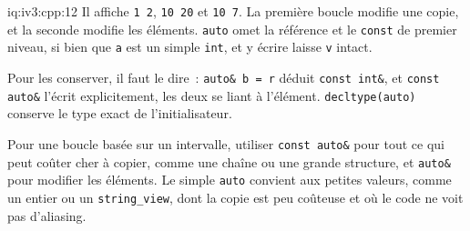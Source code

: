 \begin{solution}{iq:iv3:cpp:12}
Il affiche \texttt{1 2}, \texttt{10 20} et \texttt{10 7}. La première boucle modifie une copie, et la seconde modifie les éléments. \texttt{auto} omet la référence et le \texttt{const} de premier niveau, si bien que \texttt{a} est un simple \texttt{int}, et y écrire laisse \texttt{v} intact.

Pour les conserver, il faut le dire~: \texttt{auto\& b = r} déduit \texttt{const int\&}, et \texttt{const auto\&} l'écrit explicitement, les deux se liant à l'élément. \texttt{decltype(auto)} conserve le type exact de l'initialisateur.

Pour une boucle basée sur un intervalle, utiliser \texttt{const auto\&} pour tout ce qui peut coûter cher à copier, comme une chaîne ou une grande structure, et \texttt{auto\&} pour modifier les éléments. Le simple \texttt{auto} convient aux petites valeurs, comme un entier ou un \texttt{string\_view}, dont la copie est peu coûteuse et où le code ne voit pas d'aliasing.

\end{solution}

